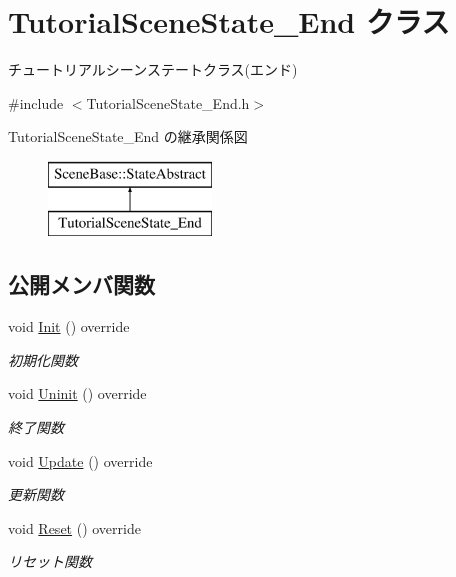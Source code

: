\hypertarget{class_tutorial_scene_state___end}{}\section{Tutorial\+Scene\+State\+\_\+\+End クラス}
\label{class_tutorial_scene_state___end}


チュートリアルシーンステートクラス(エンド)  




{\ttfamily \#include $<$Tutorial\+Scene\+State\+\_\+\+End.\+h$>$}

Tutorial\+Scene\+State\+\_\+\+End の継承関係図\begin{figure}[H]
\begin{center}
\leavevmode
\includegraphics[height=2.000000cm]{class_tutorial_scene_state___end}
\end{center}
\end{figure}
\subsection*{公開メンバ関数}
\begin{DoxyCompactItemize}
\item 
void \mbox{\hyperlink{class_tutorial_scene_state___end_a572e5687140ff5ac43789f90462c05a5}{Init}} () override
\begin{DoxyCompactList}\small\item\em 初期化関数 \end{DoxyCompactList}\item 
void \mbox{\hyperlink{class_tutorial_scene_state___end_aafc0d8d042de8c7f79d84fcdc35a807c}{Uninit}} () override
\begin{DoxyCompactList}\small\item\em 終了関数 \end{DoxyCompactList}\item 
void \mbox{\hyperlink{class_tutorial_scene_state___end_a7cdf03fa9a0e41ab86c2b41b8165ad09}{Update}} () override
\begin{DoxyCompactList}\small\item\em 更新関数 \end{DoxyCompactList}\item 
void \mbox{\hyperlink{class_tutorial_scene_state___end_ada1a87235a021b40f8eca96e31879227}{Reset}} () override
\begin{DoxyCompactList}\small\item\em リセット関数 \end{DoxyCompactList}\end{DoxyCompactItemize}
